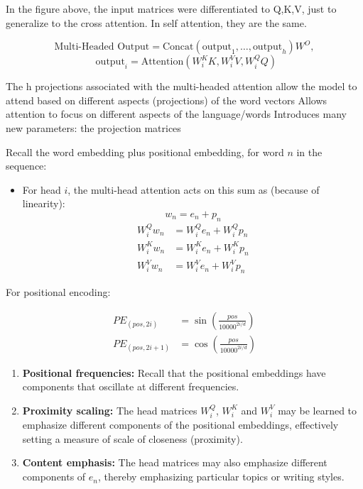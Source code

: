 \documentclass[12pt]{extarticle}
\begin{document}
In the figure above, the input matrices were differentiated to Q,K,V, just to generalize to the cross attention. In self attention, they are the same.

$$\text{Multi-Headed Output} = \text{Concat}(\text{output}_1, \ldots, \text{output}_h) W^O,$$ $$ \text{ output}_i = \text{Attention}(W_i^K K, W_i^V V, W_i^Q Q)$$


The h projections associated with the multi-headed attention allow the model to attend based
on different aspects (projections) of the word vectors
Allows attention to focus on different aspects of the language/words
 Introduces many new parameters: the projection matrices
 
Recall the word embedding plus positional embedding, for word $n$ in the sequence:
\begin{itemize}
    \item For head $i$, the multi-head attention acts on this sum as (because of linearity):
    \[
    w_n = e_n + p_n
    \]
    \begin{align*}
    W_i^Q w_n &= W_i^Q e_n + W_i^Q p_n \\
    W_i^K w_n &= W_i^K e_n + W_i^K p_n \\
    W_i^V w_n &= W_i^V e_n + W_i^V p_n
    \end{align*}
\end{itemize}

For positional encoding: 

\begin{align*}
PE_{(pos, 2i)} &= \sin\left(\frac{pos}{10000^{2i/d}}\right) \\
PE_{(pos, 2i+1)} &= \cos\left(\frac{pos}{10000^{2i/d}}\right)
\end{align*}


\begin{enumerate}
    \item \textbf{Positional frequencies:} Recall that the positional embeddings have components that oscillate at different frequencies.
    
    \item \textbf{Proximity scaling:} The head matrices $W_i^Q$, $W_i^K$ and $W_i^V$ may be learned to emphasize different components of the positional embeddings, effectively setting a measure of scale of closeness (proximity).
    
    \item \textbf{Content emphasis:} The head matrices may also emphasize different components of $e_n$, thereby emphasizing particular topics or writing styles.
\end{enumerate}
\end{document}
